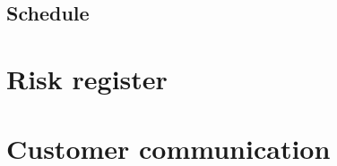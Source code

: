 \documentclass[10pt,a4paper]{article}
\begin{document}
\subsection{Schedule}


\section{Risk register}




\section{Customer communication}
\end{document}
